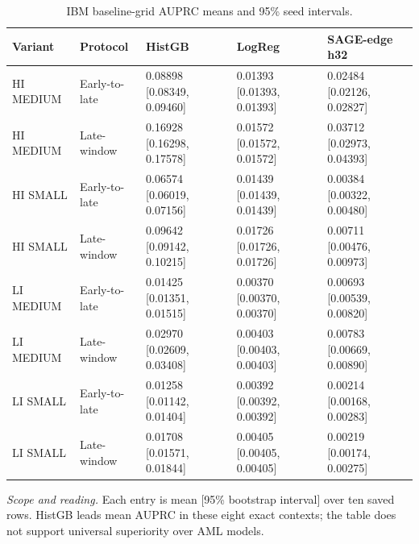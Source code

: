 \begin{table}[tbp]
\centering
\footnotesize
\setlength{\tabcolsep}{3.2pt}
\renewcommand{\arraystretch}{1.12}
\caption{IBM baseline-grid AUPRC means and 95\% seed intervals.}
\label{tab:s-ibm-baselines}
\begin{tabularx}{\textwidth}{@{}>{\raggedright\arraybackslash}p{} >{\raggedright\arraybackslash}p{} Y Y Y@{}}
\toprule
\textbf{Variant} & \textbf{Protocol} & \textbf{HistGB} & \textbf{LogReg} & \textbf{SAGE-edge h32} \\
\midrule
HI MEDIUM & Early-to-late & 0.08898 [0.08349, 0.09460] & 0.01393 [0.01393, 0.01393] & 0.02484 [0.02126, 0.02827] \\
HI MEDIUM & Late-window & 0.16928 [0.16298, 0.17578] & 0.01572 [0.01572, 0.01572] & 0.03712 [0.02973, 0.04393] \\
HI SMALL & Early-to-late & 0.06574 [0.06019, 0.07156] & 0.01439 [0.01439, 0.01439] & 0.00384 [0.00322, 0.00480] \\
HI SMALL & Late-window & 0.09642 [0.09142, 0.10215] & 0.01726 [0.01726, 0.01726] & 0.00711 [0.00476, 0.00973] \\
LI MEDIUM & Early-to-late & 0.01425 [0.01351, 0.01515] & 0.00370 [0.00370, 0.00370] & 0.00693 [0.00539, 0.00820] \\
LI MEDIUM & Late-window & 0.02970 [0.02609, 0.03408] & 0.00403 [0.00403, 0.00403] & 0.00783 [0.00669, 0.00890] \\
LI SMALL & Early-to-late & 0.01258 [0.01142, 0.01404] & 0.00392 [0.00392, 0.00392] & 0.00214 [0.00168, 0.00283] \\
LI SMALL & Late-window & 0.01708 [0.01571, 0.01844] & 0.00405 [0.00405, 0.00405] & 0.00219 [0.00174, 0.00275] \\
\bottomrule
\end{tabularx}
\vspace{2pt}
\begin{minipage}{\textwidth}\footnotesize\emph{Scope and reading.} Each entry is mean [95\% bootstrap interval] over ten saved rows. HistGB leads mean AUPRC in these eight exact contexts; the table does not support universal superiority over AML models.\end{minipage}
\end{table}
